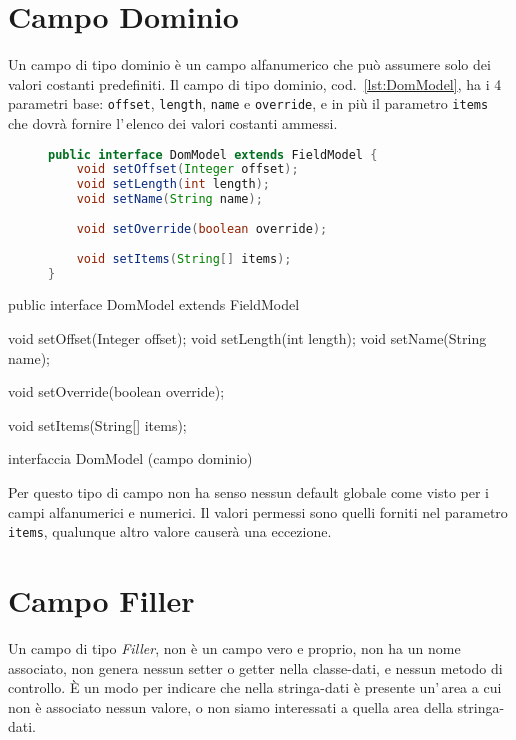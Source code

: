 \section{Campo Dominio}
Un campo di tipo dominio è un campo alfanumerico che può assumere solo dei 
valori costanti predefiniti.
Il campo di tipo dominio, cod.~\ref{lst:DomModel}, ha i 4 parametri base: 
\verb!offset!, \verb!length!, \verb!name! e \verb!override!, e in più il 
parametro \verb!items! che dovrà fornire l'\,elenco dei valori costanti ammessi.

\ifesource
\begin{figure*}[!htb]
\begin{lstlisting}[language=java, 
caption=interfaccia DomModel (campo dominio), 
label=lst:DomModel]
public interface DomModel extends FieldModel {
    void setOffset(Integer offset);
    void setLength(int length);
    void setName(String name);
    
    void setOverride(boolean override);
    
    void setItems(String[] items);
}
\end{lstlisting}
\end{figure*}
\else
\begin{elisting}[!htb]
\begin{javacode}
public interface DomModel extends FieldModel {
    void setOffset(Integer offset);
    void setLength(int length);
    void setName(String name);
    
    void setOverride(boolean override);
    
    void setItems(String[] items);
}
\end{javacode}
\caption{interfaccia DomModel (campo dominio)}
\label{lst:DomModel}
\end{elisting}
\fi

Per questo tipo di campo non ha senso nessun default globale come visto per i
campi alfanumerici e numerici. Il valori permessi sono quelli forniti nel 
parametro \verb!items!, qualunque altro valore causerà una eccezione.

\section{Campo Filler}
Un campo di tipo \textsl{Filler}, non è un campo vero e proprio, non ha un nome 
associato, non genera nessun setter o getter nella classe-dati, e nessun metodo
di controllo. È un modo per indicare che nella stringa-dati è presente un'\,area
a cui non è associato nessun valore, o non siamo interessati a quella area della
stringa-dati.

